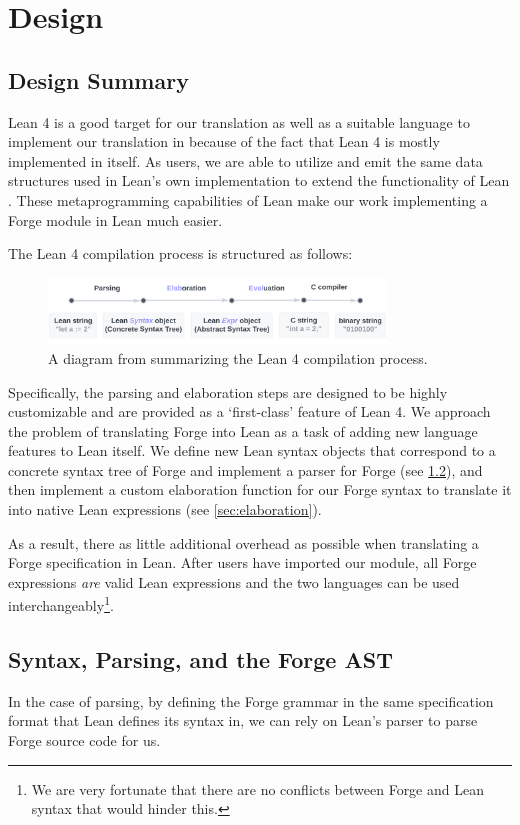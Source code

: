 \section{Design}
\subsection{Design Summary}
Lean 4 is a good target for our translation as well as a suitable language to implement our translation in because of the fact that Lean 4 is mostly implemented in itself. As users, we are able to utilize and emit the same data structures used in Lean's own implementation to extend the functionality of Lean \cite{moura2021lean}. These metaprogramming capabilities of Lean make our work implementing a Forge module in Lean much easier. 

The Lean 4 compilation process is structured as follows:
\begin{figure}[h!]
\centering
\includegraphics[width=0.8\textwidth]{images/lean-compiler.png}
\caption{A diagram from \cite{metaprogramming} summarizing the Lean 4 compilation process.}
\end{figure}

Specifically, the parsing and elaboration steps are designed to be highly customizable and are provided as a `first-class' feature of Lean 4. We approach the problem of translating Forge into Lean as a task of adding new language features to Lean itself. We define new Lean syntax objects that correspond to a concrete syntax tree of Forge and implement a parser for Forge (see \cref{sec:parsing}), and then implement a custom elaboration function for our Forge syntax to translate it into native Lean expressions (see \cref{sec:elaboration}). 

As a result, there as little additional overhead as possible when translating a Forge specification in Lean. After users have imported our module, all Forge expressions \emph{are} valid Lean expressions and the two languages can be used interchangeably\footnote{We are very fortunate that there are no conflicts between Forge and Lean syntax that would hinder this.}.

\subsection{Syntax, Parsing, and the Forge AST}\label{sec:parsing}
In the case of parsing, by defining the Forge grammar in the same specification format that Lean defines its syntax in, we can rely on Lean's parser to parse Forge source code for us.

